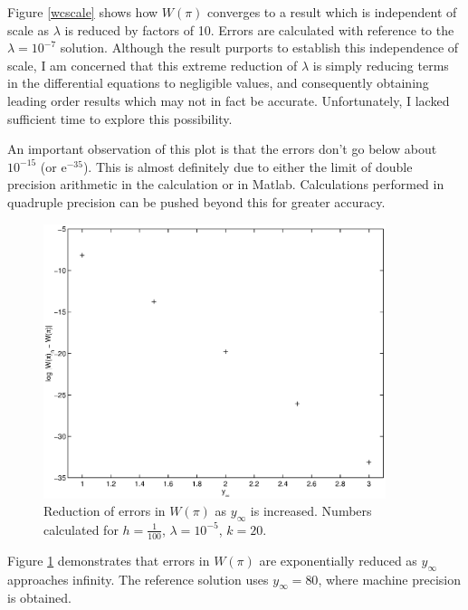 \documentclass[10pt,a4paper]{report}
\begin{document}
Figure \ref{wcscale} shows how $W(\pi)$ converges to a result which is independent of scale as $\lambda$ is reduced by factors of 10. Errors are calculated with reference to the $\lambda = 10^{-7}$ solution. Although the result purports to establish this independence of scale, I am concerned that this extreme reduction of $\lambda$ is simply reducing terms in the differential equations to negligible values, and consequently obtaining leading order results which may not in fact be accurate. Unfortunately, I lacked sufficient time to explore this possibility.

An important observation of this plot is that the errors don't go below about $10^{-15}$ (or $\textrm{e}^{-35}$). This is almost definitely due to either the limit of double precision arithmetic in the calculation or in Matlab. Calculations performed in quadruple precision can be pushed beyond this for greater accuracy.

\begin{figure}[p]
\centering
\includegraphics[width=10cm]{pics/wcpi_inf.eps}
\caption[Reduction of errors in $W(\pi)$ with increase of $y_\infty$]{Reduction of errors in $W(\pi)$ as $y_\infty$ is increased. Numbers calculated for $h = \frac{1}{100}$, $\lambda = 10^{-5}$, $k=20$.}
\label{wcinfty}
\end{figure}


Figure \ref{wcinfty} demonstrates that errors in $W(\pi)$ are exponentially reduced as $y_\infty$ approaches infinity. The reference solution uses $y_\infty = 80$, where machine precision is obtained.
\end{document}

